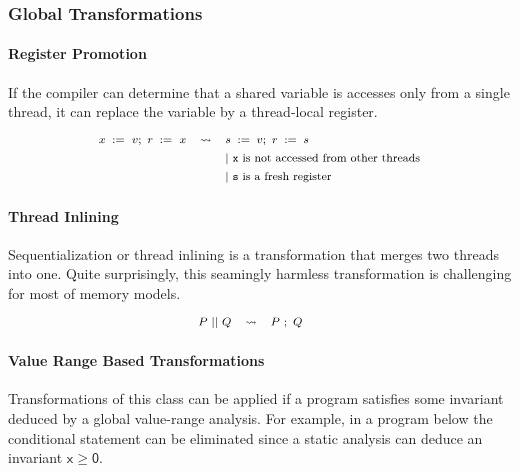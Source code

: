 \subsubsection{Global Transformations}

\paragraph{Register Promotion}

If the compiler can determine that a shared variable 
is accesses only from a single thread, it can replace 
the variable by a thread-local register. 
%
\[\def\arraystretch{1.4}\footnotesize
  \begin{array}{ccl} 

      \writeInst{}{x}{v} \seq \readInst{}{r}{x} 
    & \leadsto 
    & \assignInst{s}{v} \seq \assignInst{r}{s}
    \\ 
    
    & & |~ \text{\texttt{x} is not accessed from other threads} \\
    & & |~ \text{\texttt{s} is a fresh register} \\ 

  \end{array}
\]

\paragraph{Thread Inlining}

Sequentialization or thread inlining 
is a transformation that merges two threads into one.
Quite surprisingly, this seamingly harmless transformation
is challenging for most of memory models. 
%
\[\def\arraystretch{1.4}\footnotesize
  \begin{array}{cccl} 

      P \pll Q 
    & \leadsto 
    & P ~\seq Q
    & ~ \\ 
    
  \end{array}
\]


\paragraph{Value Range Based Transformations}

Transformations of this class can be applied 
if a program satisfies some invariant deduced 
by a global value-range analysis. 
For example, in a program below   
the conditional statement can be eliminated 
since a static analysis can deduce an invariant 
$\mathsf{x} \geq \mathsf{0}$.

